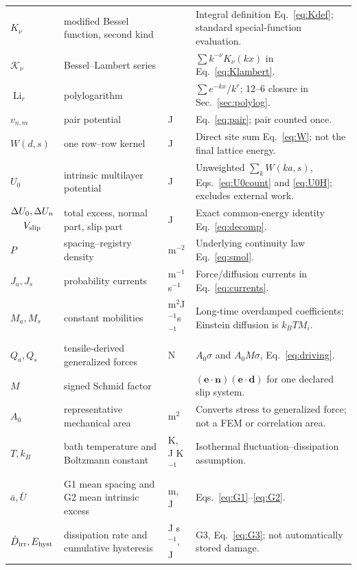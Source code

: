 \begin{longtable}{>{\raggedright\arraybackslash}p{}>{\raggedright\arraybackslash}p{}>{\raggedright\arraybackslash}p{}>{\raggedright\arraybackslash}p{}}
$K_\nu$ & modified Bessel function, second kind & 1 & Integral definition Eq.~\eqref{eq:Kdef}; standard special-function evaluation.\\
$\mathcal K_\nu$ & Bessel--Lambert series & 1 & $\sum k^{-\nu}K_\nu(kx)$ in Eq.~\eqref{eq:Klambert}.\\
$\operatorname{Li}_r$ & polylogarithm & 1 & $\sum e^{-kx}/k^r$; 12--6 closure in Sec.~\ref{sec:polylog}.\\
$v_{n,m}$ & pair potential & J & Eq.~\eqref{eq:pair}; pair counted once.\\
$W(d,s)$ & one row--row kernel & J & Direct site sum Eq.~\eqref{eq:W}; not the final lattice energy.\\
$U_0$ & intrinsic multilayer potential & J & Unweighted $\sum_kW(ka,s)$, Eqs.~\eqref{eq:U0count} and \eqref{eq:U0H}; excludes external work.\\
$\begin{gathered}\Delta U_0,\Delta U_n\\V_{\rm slip}\end{gathered}$ & total excess, normal part, slip part & J & Exact common-energy identity Eq.~\eqref{eq:decomp}.\\
$P$ & spacing--registry density & m$^{-2}$ & Underlying continuity law Eq.~\eqref{eq:smol}.\\
$J_a,J_s$ & probability currents & m$^{-1}$s$^{-1}$ & Force/diffusion currents in Eq.~\eqref{eq:currents}.\\
$M_a,M_s$ & constant mobilities & m$^2$J$^{-1}$s$^{-1}$ & Long-time overdamped coefficients; Einstein diffusion is $k_BT M_i$.\\
$Q_a,Q_s$ & tensile-derived generalized forces & N & $A_0\sigma$ and $A_0M\sigma$, Eq.~\eqref{eq:driving}.\\
$M$ & signed Schmid factor & 1 & $(\bm e\cdot\bm n)(\bm e\cdot\bm d)$ for one declared slip system.\\
$A_0$ & representative mechanical area & m$^2$ & Converts stress to generalized force; not a FEM or correlation area.\\
$T,k_B$ & bath temperature and Boltzmann constant & K, J K$^{-1}$ & Isothermal fluctuation--dissipation assumption.\\
$\bar a,\bar U$ & G1 mean spacing and G2 mean intrinsic excess & m, J & Eqs.~\eqref{eq:G1}--\eqref{eq:G2}.\\
$\dot D_{\rm irr},E_{\rm hyst}$ & dissipation rate and cumulative hysteresis & J s$^{-1}$, J & G3, Eq.~\eqref{eq:G3}; not automatically stored damage.\\

\end{longtable}
